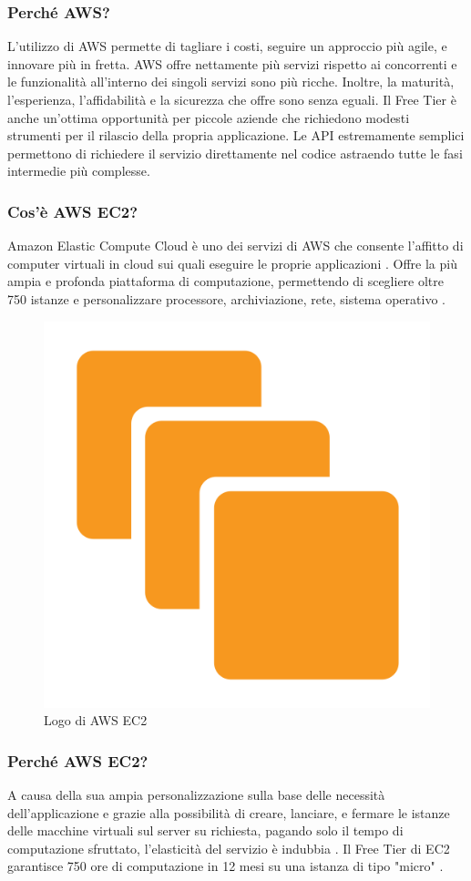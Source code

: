             \subsubsection{Perché AWS? \cite{AWS1}}
                L'utilizzo di AWS permette di tagliare i costi, seguire un approccio più agile, e innovare più in fretta. AWS offre nettamente più servizi rispetto ai concorrenti e le funzionalità all'interno dei singoli servizi sono più ricche. Inoltre, la maturità, l'esperienza, l'affidabilità e la sicurezza che offre sono senza eguali. Il Free Tier è anche un'ottima opportunità per piccole aziende che richiedono modesti strumenti per il rilascio della propria applicazione. Le API estremamente semplici permettono di richiedere il servizio direttamente nel codice astraendo tutte le fasi intermedie più complesse.
            \subsubsection{Cos'è AWS EC2?}
                Amazon Elastic Compute Cloud è uno dei servizi di AWS che consente l'affitto di computer virtuali in cloud sui quali eseguire le proprie applicazioni \cite{Wikipedia6}. Offre la più ampia e profonda piattaforma di computazione, permettendo di scegliere oltre 750 istanze e personalizzare processore, archiviazione, rete, sistema operativo \cite{AWS2}.
            \begin{figure}[htbp!]
                \centering
                \includegraphics[width=0.2\linewidth]{Immagini/System Design/AWS EC2.png}
                \caption{Logo di AWS EC2}
            \end{figure}
            \subsubsection{Perché AWS EC2?}
                A causa della sua ampia personalizzazione sulla base delle necessità dell'applicazione e grazie alla possibilità di creare, lanciare, e fermare le istanze delle macchine virtuali sul server su richiesta, pagando solo il tempo di computazione sfruttato, l'elasticità del servizio è indubbia \cite{Wikipedia6}. Il Free Tier di EC2 garantisce 750 ore di computazione in 12 mesi su una istanza di tipo "micro" \cite{AWS3}.
